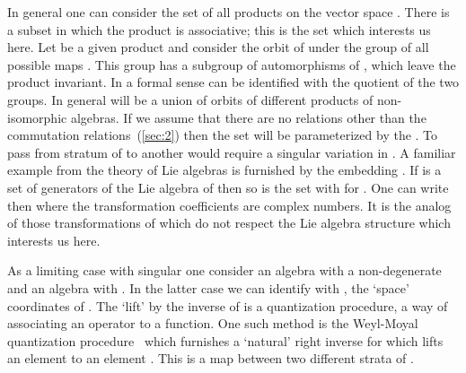 \documentclass[a4paper,12pt]{article}
\def\h#1{\hat #1}
\def\t#1{\tilde #1}
\def\c#1{{\cal #1}}
\def\t#1{\tilde #1}
\begin{document}
In general one can consider the set \coordHE{} of all products on the
vector space \myHighlight{$\c{A}$}\coordHE{}. There is a subset \coordHE{} in which the
product is associative; this is the set which interests us here. Let
\myHighlight{$\pi$}\coordHE{} be a given product and consider the orbit \coordHE{} of
\myHighlight{$\pi$}\coordHE{} under the group of all possible maps \myHighlight{$\rho$}\coordHE{}. This group has a
subgroup of automorphisms of \myHighlight{$\c{A}$}\coordHE{}, which leave the product
invariant. In a formal sense \coordHE{} can be identified with the quotient
of the two groups. In general \coordHE{} will be a union of orbits of
different products of non-isomorphic algebras. If we assume that there
are no relations other than the commutation relations~(\ref{sec:2})
then the set \coordHE{} will be parameterized by the \coordHE{}. To pass from
stratum of \coordHE{} to another would require a singular variation in \coordHE{}.
A familiar example from the theory of Lie algebras is furnished by the 
embedding \coordHE{}. If \coordHE{} is a
set of generators of the Lie algebra of \coordHE{} then so is the set
\myHighlight{$\{\h{\lambda}_i\}$}\coordHE{} with \myHighlight{$\h{\lambda}_i = g^{-1} \lambda_i g$}\coordHE{} for 
\coordHE{}. One can write then 
\myHighlight{$\{\h{\lambda}_i\} = \Lambda_i^j \lambda_j$}\coordHE{} where the transformation
coefficients are complex numbers. It is the analog of those
transformations of \coordHE{} which do not respect the Lie algebra
structure which interests us here.

As a limiting case with singular \myHighlight{$\rho$}\coordHE{} one consider an algebra 
\myHighlight{$\h{\c}{A}$}\coordHE{} with a non-degenerate \myHighlight{$\h{J}$}\coordHE{} and an algebra \myHighlight{$\c{A}$}\coordHE{} with 
\coordHE{}. In the latter case we can
identify \coordHE{} with \myHighlight{$\t{x}^i$}\coordHE{}, the `space' coordinates of 
\myHighlight{$\t{\c}{A}$}\coordHE{}. The `lift' by the inverse of \myHighlight{$\rho$}\coordHE{} is a
quantization procedure, a way of associating an operator to a
function.  One such method is the Weyl-Moyal quantization
procedure~\cite{Wey50,Moy49} which furnishes a `natural' right inverse 
for \myHighlight{$\rho$}\coordHE{} which lifts an element \myHighlight{$f \in \c{A}$}\coordHE{} to an element 
\myHighlight{$\h{f} \in \h{\c}{A}$}\coordHE{}. This is a map between two different strata of
\coordHE{}.
\end{document}
